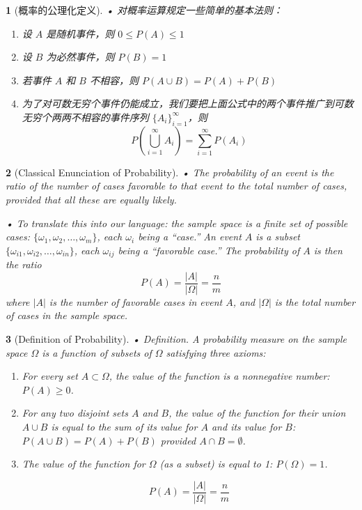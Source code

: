 \documentclass[UTF8]{report}
\theoremstyle{MyLineTheoremStyle} %
\theoremstyle{MyBlockTheoremStyle} %
\theoremstyle{MySubsubsectionStyle} %
\newtheorem{definition}{}
\begin{document}
\begin{definition}[概率的公理化定义]
    • 对概率运算规定一些简单的基本法则：
    \begin{enumerate}
        \item 设 \( A \) 是随机事件，则 \( 0 \leq P(A) \leq 1 \)
        \item 设 \( B \) 为必然事件，则 \( P(B) = 1 \)
        \item 若事件 \( A \) 和 \( B \) 不相容，则 \( P(A \cup B) = P(A) + P(B) \)
        \item 为了对可数无穷个事件仍能成立，我们要把上面公式中的两个事件推广到可数无穷个两两不相容的事件序列 \(\{A_i\}_{i=1}^{\infty}\)，则
        \[
        P\left(\bigcup_{i=1}^{\infty} A_i\right) = \sum_{i=1}^{\infty} P(A_i)
        \]
    \end{enumerate}
\end{definition}

\begin{definition}[Classical Enunciation of Probability]
    • The probability of an event is the ratio of the number of cases 
    favorable to that event to the total number of cases, provided 
    that all these are equally likely.\par
    • To translate this into our language: the sample space is a finite 
    set of possible cases: \(\{\omega_1, \omega_2, \ldots, \omega_m\}\), each \(\omega_i\) being a “case.” An 
    event \(A\) is a subset \(\{\omega_{i1}, \omega_{i2}, \ldots, \omega_{in}\}\), each \(\omega_{ij}\) being a “favorable 
    case.” The probability of \(A\) is then the ratio
    \[
    P(A) = \frac{|A|}{|\Omega|} = \frac{n}{m}
    \]
    where \(|A|\) is the number of favorable cases in event \(A\), and \(|\Omega|\) is the total number of cases in the sample space.
\end{definition}

\begin{definition}[Definition of Probability]
    • Definition. A probability measure on the sample space \(\Omega\) is a 
    function of subsets of \(\Omega\) satisfying three axioms:
    \begin{enumerate}
        \item For every set \(A \subset \Omega\), the value of the function is a nonnegative 
        number: \(P(A) \geq 0\).
        \item For any two disjoint sets \(A\) and \(B\), the value of the function for 
        their union \(A \cup B\) is equal to the sum of its value for \(A\) and its 
        value for \(B\): \(P(A \cup B) = P(A) + P(B)\) provided \(A \cap B = \emptyset\).
        \item The value of the function for \(\Omega\) (as a subset) is equal to 1: 
        \(P(\Omega) = 1\).\par
        \[
    P(A) = \frac{|A|}{|\Omega|} = \frac{n}{m}
    \]
    \end{enumerate}
\end{definition}
\end{document}
